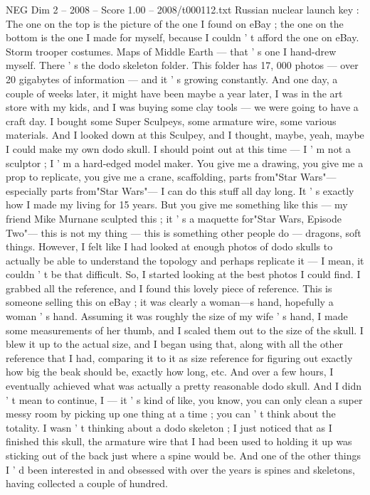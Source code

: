 \begin{textsample}{NEG Dim 2 – 2008 – Score 1.00 – 2008/t000112.txt}
Russian nuclear launch key : The one on the top is the picture of the one I found on eBay ; the one on the bottom is the one I made for myself, because I couldn ' t afford the one on eBay.
Storm trooper costumes.
Maps of Middle Earth — that ' s one I hand-drew myself.
There ' s the dodo skeleton folder.
This folder has 17, 000 photos — over 20 gigabytes of information — and it ' s growing constantly.
And one day, a couple of weeks later, it might have been maybe a year later, I was in the art store with my kids, and I was buying some clay tools — we were going to have a craft day.
I bought some Super Sculpeys, some armature wire, some various materials.
And I looked down at this Sculpey, and I thought, maybe, yeah, maybe I could make my own dodo skull.
I should point out at this time — I ' m not a sculptor ; I ' m a hard-edged model maker.
You give me a drawing, you give me a prop to replicate, you give me a crane, scaffolding, parts from"Star Wars"— especially parts from"Star Wars"— I can do this stuff all day long.
It ' s exactly how I made my living for 15 years.
But you give me something like this — my friend Mike Murnane sculpted this ; it ' s a maquette for"Star Wars, Episode Two"— this is not my thing — this is something other people do — dragons, soft things.
However, I felt like I had looked at enough photos of dodo skulls to actually be able to understand the topology and perhaps replicate it — I mean, it couldn ' t be that difficult.
So, I started looking at the best photos I could find.
I grabbed all the reference, and I found this lovely piece of reference.
This is someone selling this on eBay ; it was clearly a woman—s hand, hopefully a woman ' s hand.
Assuming it was roughly the size of my wife ' s hand, I made some measurements of her thumb, and I scaled them out to the size of the skull.
I blew it up to the actual size, and I began using that, along with all the other reference that I had, comparing it to it as size reference for figuring out exactly how big the beak should be, exactly how long, etc.
And over a few hours, I eventually achieved what was actually a pretty reasonable dodo skull.
And I didn ' t mean to continue, I — it ' s kind of like, you know, you can only clean a super messy room by picking up one thing at a time ; you can ' t think about the totality.
I wasn ' t thinking about a dodo skeleton ; I just noticed that as I finished this skull, the armature wire that I had been used to holding it up was sticking out of the back just where a spine would be.
And one of the other things I ' d been interested in and obsessed with over the years is spines and skeletons, having collected a couple of hundred.

\end{textsample}
